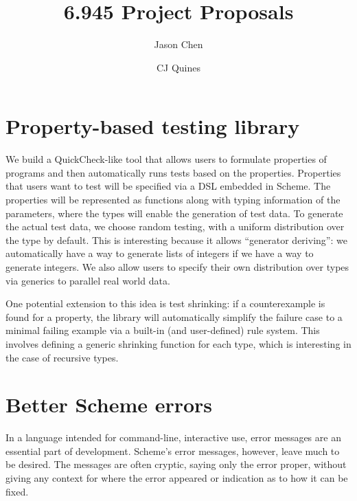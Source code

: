 \documentclass{scrartcl}
\title{6.945 Project Proposals}
\author{Jason Chen \and CJ Quines}
\begin{document}
\maketitle

\section{Property-based testing library}

We build a QuickCheck-like tool that allows users to
formulate properties of programs and then
automatically runs tests based on the properties.
Properties that users want to test will be specified
via a DSL embedded in Scheme.
The properties will be represented as functions
along with typing information of the parameters,
where the types will enable the generation of test data.
To generate the actual test data, we choose random testing,
with a uniform distribution over the type by default.
This is interesting because it allows ``generator deriving'':
we automatically have a way to generate lists of integers
if we have a way to generate integers.
We also allow users to specify their own distribution
over types via generics to parallel real world data. %

One potential extension to this idea is test shrinking:
if a counterexample is found for a property,
the library will automatically simplify
the failure case to a minimal failing example
via a built-in (and user-defined) rule system.
This involves defining a generic shrinking function for each type,
which is interesting in the case of recursive types.



\section{Better Scheme errors}

In a language intended for command-line, interactive use, error messages are an
essential part of development. Scheme's error messages, however, leave much to
be desired. The messages are often cryptic, saying only the error proper,
without giving any context for where the error appeared or indication as to how
it can be fixed.
\end{document}
